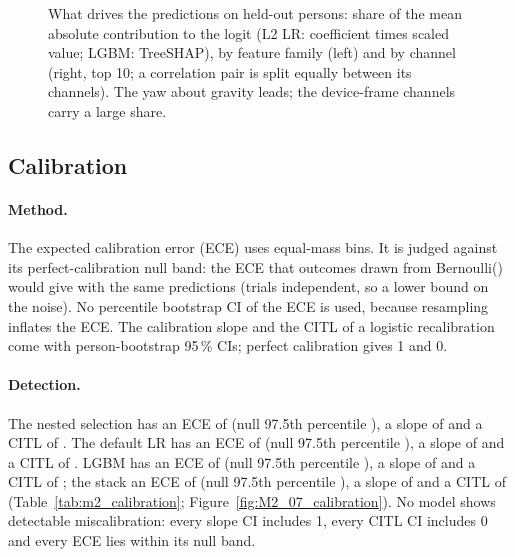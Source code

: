 \begin{figure}[tbp]
\centering
{}
\caption{What drives the predictions on held-out persons: share of the mean absolute contribution to the logit
(L2 LR: coefficient times scaled value; LGBM: TreeSHAP), by feature family (left) and by channel (right, top
10; a correlation pair is split equally between its channels). The yaw about gravity leads; the device-frame
channels carry a large share.}
\label{fig:M2_06_importance}\label{fig:app:m2-importance}
\end{figure}

\FloatBarrier
\subsection{Calibration}\label{app:m2:calibration}

\paragraph{Method.} The expected calibration error (ECE) uses  equal-mass bins. It is judged
against its perfect-calibration null band: the ECE that outcomes drawn from Bernoulli(\pright) would give with
the same predictions (trials independent, so a lower bound on the noise). No percentile bootstrap CI of the ECE
is used, because resampling inflates the ECE. The calibration slope and the CITL of a logistic recalibration
come with person-bootstrap 95\,\% CIs; perfect calibration gives 1 and 0.

\paragraph{Detection.} The nested selection has an ECE of  (null 97.5th percentile
), a slope of  and a CITL of
. The default LR has an ECE of  (null 97.5th
percentile ), a slope of  and a CITL of
. LGBM has an ECE of  (null 97.5th percentile
), a slope of  and a CITL of
; the stack an ECE of  (null 97.5th percentile
), a slope of  and a CITL of
 (Table~\ref{tab:m2_calibration}; Figure~\ref{fig:M2_07_calibration}). No model
shows detectable miscalibration: every slope CI includes 1, every CITL CI includes 0 and every ECE lies within
its null band.

